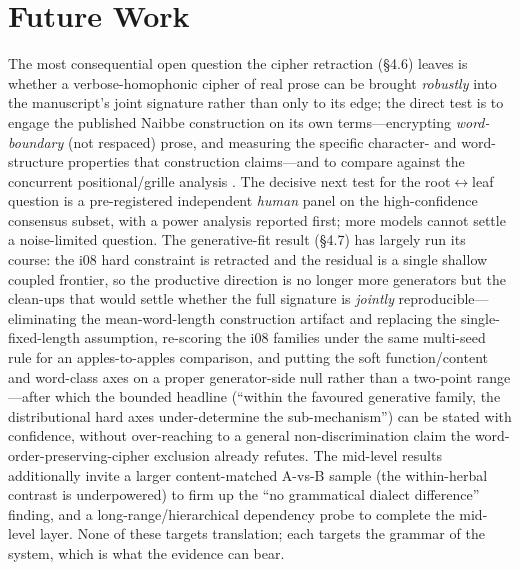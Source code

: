 \documentclass[11pt]{article}
\begin{document}
\section{Future Work}
The most consequential open question the cipher retraction (\S4.6) leaves is whether a
verbose-homophonic cipher of real prose can be brought \emph{robustly} into the manuscript's
joint signature rather than only to its edge; the direct test is to engage the published
Naibbe construction \citep{greshko2025naibbe} on its own terms---encrypting
\emph{word-boundary} (not respaced) prose, and measuring the specific character- and
word-structure properties that construction claims---and to compare against the concurrent
positional/grille analysis \citep{parisel2026layered}. The decisive next test for the
root$\leftrightarrow$leaf question is a pre-registered
independent \emph{human} panel on the high-confidence consensus subset, with a power
analysis reported first; more models cannot settle a noise-limited question. The
generative-fit result (\S4.7) has largely run its course: the i08 hard constraint is
retracted and the residual is a single shallow coupled frontier, so the productive direction
is no longer more generators but the clean-ups that would settle whether the full signature
is \emph{jointly} reproducible---eliminating the mean-word-length construction artifact and
replacing the single-fixed-length assumption, re-scoring the i08 families under the same
multi-seed rule for an apples-to-apples comparison, and putting the soft function/content and
word-class axes on a proper generator-side null rather than a two-point range---after which
the bounded headline (``within the favoured generative family, the distributional hard axes
under-determine the sub-mechanism'') can be stated with confidence, without over-reaching to
a general non-discrimination claim the word-order-preserving-cipher exclusion already refutes. The mid-level
results additionally
invite a larger content-matched A-vs-B sample (the within-herbal contrast is
underpowered) to firm up the ``no grammatical dialect difference'' finding, and a
long-range/hierarchical dependency probe to complete the mid-level layer. None of these
targets translation; each targets the grammar of the system, which is what the evidence
can bear.
\end{document}
